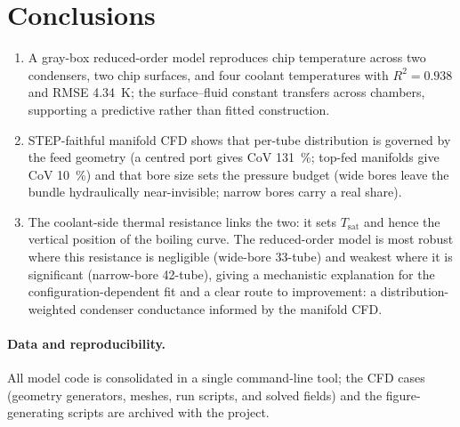 \documentclass[11pt]{article}
\begin{document}
\section{Conclusions}
\begin{enumerate}
\item A gray-box reduced-order model reproduces chip temperature across two condensers, two
chip surfaces, and four coolant temperatures with $R^2=0.938$ and RMSE \SI{4.34}{\kelvin}; the
surface--fluid constant transfers across chambers, supporting a predictive rather than fitted
construction.
\item STEP-faithful manifold CFD shows that per-tube distribution is governed by the feed
geometry (a centred port gives CoV \SI{131}{\percent}; top-fed manifolds give CoV
\SI{10}{\percent}) and that bore size sets the pressure budget (wide bores leave the bundle
hydraulically near-invisible; narrow bores carry a real share).
\item The coolant-side thermal resistance links the two: it sets $T_{\mathrm{sat}}$ and hence
the vertical position of the boiling curve. The reduced-order model is most robust where this
resistance is negligible (wide-bore 33-tube) and weakest where it is significant
(narrow-bore 42-tube), giving a mechanistic explanation for the configuration-dependent fit and
a clear route to improvement: a distribution-weighted condenser conductance informed by the
manifold CFD.
\end{enumerate}

\paragraph{Data and reproducibility.} All model code is consolidated in a single
command-line tool; the CFD cases (geometry generators, meshes, run scripts, and solved fields)
and the figure-generating scripts are archived with the project.
\end{document}
